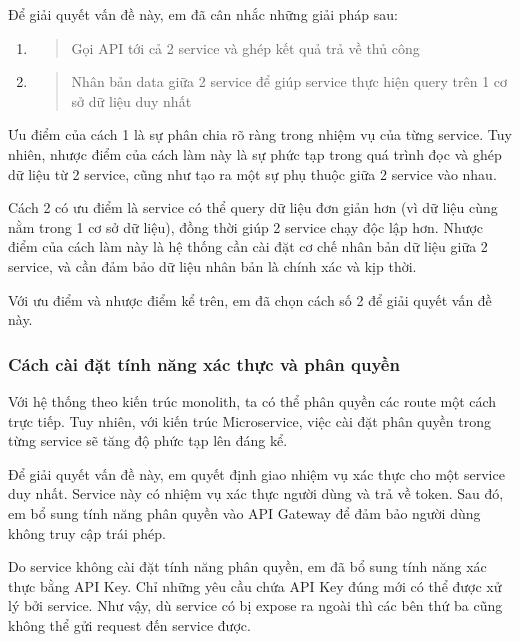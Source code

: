 \documentclass[./../main.tex]{subfiles}
\begin{document}
Để giải quyết vấn đề này, em đã cân nhắc những giải pháp sau:

\begin{enumerate}
\def\labelenumi{\arabic{enumi}.}
\item
  \begin{quote}
  Gọi API tới cả 2 service và ghép kết quả trả về thủ công
  \end{quote}
\item
  \begin{quote}
  Nhân bản data giữa 2 service để giúp service thực hiện query trên 1 cơ
  sở dữ liệu duy nhất
  \end{quote}
\end{enumerate}

Ưu điểm của cách 1 là sự phân chia rõ ràng trong nhiệm vụ của từng
service. Tuy nhiên, nhược điểm của cách làm này là sự phức tạp trong quá
trình đọc và ghép dữ liệu từ 2 service, cũng như tạo ra một sự phụ thuộc
giữa 2 service vào nhau.

Cách 2 có ưu điểm là service có thể query dữ liệu đơn giản hơn (vì dữ
liệu cùng nằm trong 1 cơ sở dữ liệu), đồng thời giúp 2 service chạy độc
lập hơn. Nhược điểm của cách làm này là hệ thống cần cài đặt cơ chế nhân
bản dữ liệu giữa 2 service, và cần đảm bảo dữ liệu nhân bản là chính xác
và kịp thời.

Với ưu điểm và nhược điểm kể trên, em đã chọn cách số 2 để giải quyết
vấn đề này.

\hypertarget{cuxe1ch-cuxe0i-ux111ux1eb7t-tuxednh-nux103ng-xuxe1c-thux1ef1c-vuxe0-phuxe2n-quyux1ec1n}{%
\subsubsection{Cách cài đặt tính năng xác thực và phân
quyền}\label{cuxe1ch-cuxe0i-ux111ux1eb7t-tuxednh-nux103ng-xuxe1c-thux1ef1c-vuxe0-phuxe2n-quyux1ec1n}}

Với hệ thống theo kiến trúc monolith, ta có thể phân quyền các route một
cách trực tiếp. Tuy nhiên, với kiến trúc Microservice, việc cài đặt phân
quyền trong từng service sẽ tăng độ phức tạp lên đáng kể.

Để giải quyết vấn đề này, em quyết định giao nhiệm vụ xác thực cho một
service duy nhất. Service này có nhiệm vụ xác thực người dùng và trả về
token. Sau đó, em bổ sung tính năng phân quyền vào API Gateway để đảm
bảo người dùng không truy cập trái phép.

Do service không cài đặt tính năng phân quyền, em đã bổ sung tính năng
xác thực bằng API Key. Chỉ những yêu cầu chứa API Key đúng mới có thể
được xử lý bởi service. Như vậy, dù service có bị expose ra ngoài thì
các bên thứ ba cũng không thể gửi request đến service được.
\end{document}
